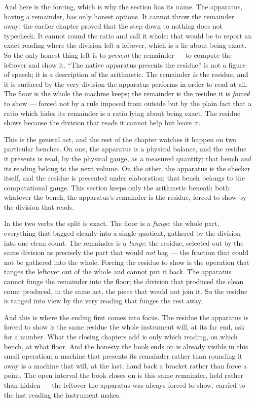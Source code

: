 And here is the forcing, which is why the section has its name. The apparatus, having a remainder, has only honest
options. It cannot throw the remainder away: the earlier chapter proved that the step down to nothing does not
typecheck. It cannot round the ratio and call it whole: that would be to report an exact reading where the division
left a leftover, which is a lie about being exact. So the only honest thing left is to \emph{present} the remainder ---
to compute the leftover and show it. ``The native apparatus presents the residue'' is not a figure of speech; it is a
description of the arithmetic. The remainder \emph{is} the residue, and it is surfaced by the very division the
apparatus performs in order to read at all. The floor is the whole the machine keeps; the remainder is the residue it
is \emph{forced} to show --- forced not by a rule imposed from outside but by the plain fact that a ratio which hides
its remainder is a ratio lying about being exact. The residue shows because the division that reads it cannot help but
leave it.

This is the general act, and the rest of the chapter watches it happen on two particular benches. On one, the
apparatus is a physical balance, and the residue it presents is read, by the physical gauge, as a measured quantity;
that bench and its reading belong to the next volume. On the other, the apparatus is the checker itself, and the
residue is presented under elaboration; that bench belongs to the computational gauge. This section keeps only the
arithmetic beneath both: whatever the bench, the apparatus's remainder is the residue, forced to show by the division
that reads.

In the two verbs the split is exact. The floor is a \emph{funge}: the whole part, everything that bagged cleanly into a
single quotient, gathered by the division into one clean count. The remainder is a \emph{tange}: the residue, selected
out by the same division as precisely the part that would \emph{not} bag --- the fraction that could not be gathered
into the whole. Forcing the residue to show is the operation that tanges the leftover out of the whole and cannot put
it back. The apparatus cannot funge the remainder into the floor; the division that produced the clean count produced,
in the same act, the piece that would not join it. So the residue is tanged into view by the very reading that funges
the rest away.

And this is where the ending first comes into focus. The residue the apparatus is forced to show is the same residue
the whole instrument will, at its far end, ask for a number. What the closing chapters add is only which reading, on
which bench, at what floor. And the honesty the book ends on is already visible in this small operation: a machine that
presents its remainder rather than rounding it away is a machine that will, at the last, hand back a bracket rather
than force a point. The open interval the book closes on is this same remainder, held rather than hidden --- the
leftover the apparatus was always forced to show, carried to the last reading the instrument makes.

